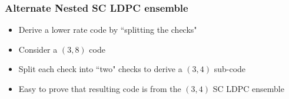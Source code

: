 \documentclass[10pt,presentation]{beamer}
\begin{document}
\begin{frame}\frametitle{Alternate Nested SC LDPC ensemble}
\begin{itemize}
		\item<1-> Derive a lower rate code by ``splitting the checks"
					\vspace{2pt}
		\item<1-> Consider a $(3,8)$ code
					\vspace{2pt}
		\item<2-> Split each check into ``two" checks to derive a $(3,4)$ sub-code
					\vspace{2pt}
		\item<2-> Easy to prove that resulting code is from the $(3,4)$ SC LDPC ensemble
\end{itemize}
\vspace{0.3in}
    \begin{figure}
        \begin{center}

\end{center}
\end{figure}
\end{frame}
\end{document}
